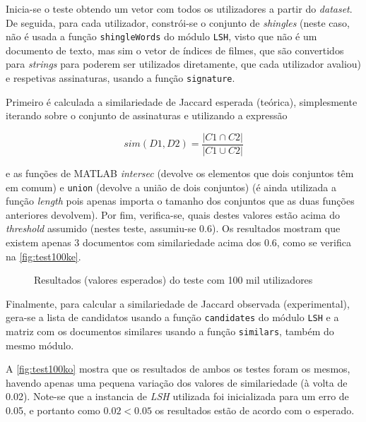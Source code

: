 \documentclass[a4paper,11pt,openright,oneside]{report}
\begin{document}
Inicia-se o teste obtendo um vetor com todos os utilizadores a partir do \textit{dataset}. De seguida, para cada utilizador, constrói-se o conjunto de \textit{shingles} (neste caso, não é usada a função \texttt{shingleWords} do módulo \texttt{LSH}, visto que não é um documento de texto, mas sim o vetor de índices de filmes, que são convertidos para \textit{strings} para poderem ser utilizados diretamente, que cada utilizador avaliou) e respetivas assinaturas, usando a função \texttt{signature}. 

Primeiro é calculada a similariedade de Jaccard esperada (teórica), simplesmente iterando sobre o conjunto de assinaturas e utilizando a expressão 

$$ sim(D1, D2) = \frac{|C1\cap C2|}{|C1\cup C2|} $$

e as funções de MATLAB \textit{intersec} (devolve os elementos que dois conjuntos têm em comum) e \texttt{union} (devolve a união de dois conjuntos) (é ainda utilizada a função \textit{length} pois apenas importa o tamanho dos conjuntos que as duas funções anteriores devolvem). Por fim, verifica-se, quais destes valores estão acima do \textit{threshold} assumido (nestes teste, assumiu-se 0.6). Os resultados mostram que existem apenas 3 documentos com similariedade acima dos 0.6, como se verifica na \autoref{fig:test100ke}.

\begin{figure}[ht]
\center
{}
\caption{Resultados (valores esperados) do teste com 100 mil utilizadores}
\label{fig:test100ke}
\end{figure}

Finalmente, para calcular a similariedade de Jaccard observada (experimental), gera-se a lista de candidatos usando a função \texttt{candidates} do módulo \texttt{LSH} e a matriz com os documentos similares usando a função \texttt{similars}, também do mesmo módulo.

A \autoref{fig:test100ko} mostra que os resultados de ambos os testes foram os mesmos, havendo apenas uma pequena variação dos valores de similariedade (à volta de 0.02). Note-se que a instancia de \textit{LSH} utilizada foi inicializada para um erro de 0.05, e portanto como $0.02 < 0.05$ os resultados estão de acordo com o esperado.
\end{document}
